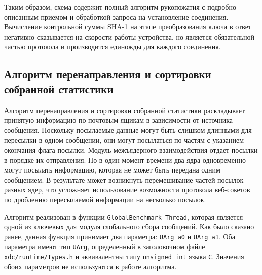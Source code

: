 Таким образом, схема \websockHandshakeScheme{} содержит полный алгоритм рукопожатия
с подробно описанным приемом и обработкой запроса на установление соединения.
Вычисление контрольной суммы SHA-1 на этапе преобразования ключа в ответ
негативно сказывается на скорости работы устройства, но является обязательной частью
протокола и производится единожды для каждого соединения.

\subsection{Алгоритм перенаправления и сортировки собранной статистики}

Алгоритм перенаправления и сортировки собранной статистики раскладывает
принятую информацию по почтовым ящикам в зависимости от источника сообщения.
Поскольку посылаемые данные могут быть слишком длинными для пересылки в
одном сообщении, они могут посылаться по частям с указанием окончания флага посылки.
Модуль межъядерного взаимодействия отдает посылки в порядке их отправления.
Но в один момент времени два ядра одновременно могут посылать информацию,
которая не может быть передана одним сообщением. В результате может возникнуть
перемешивание частей посылок разных ядер, что усложняет использование
возможности протокола веб-сокетов по дроблению пересылаемой информации на
несколько посылок.

Алгоритм реализован в функции \texttt{GlobalBenchmark\_Thread}, которая
является одной из ключевых для модуля глобального сбора сообщений. Как было сказано
ранее, данная функция принимает два параметра: \texttt{UArg a0} и \texttt{UArg a1}.
Оба параметра имеют тип \texttt{UArg}, определенный в заголовочном файле
\texttt{xdc/runtime/Types.h} и эквивалентны типу \texttt{unsigned int} языка
\texttt{C}. Значения обоих параметров не используются в работе алгоритма.

